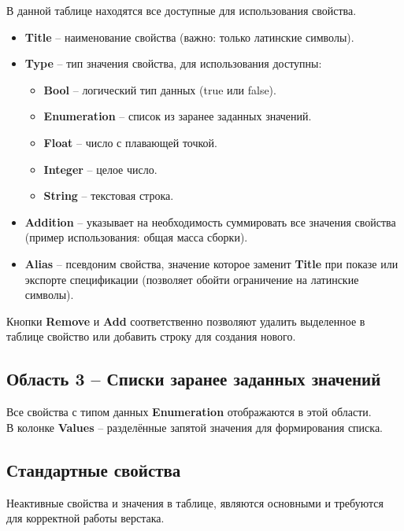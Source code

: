 \documentclass[a4paper,12pt]{article}
\begin{document}
В данной таблице находятся все доступные для использования свойства.
\begin{itemize}
	\item \textbf{Title} -- наименование свойства (важно: только латинские символы).
	\item \textbf{Type} -- тип значения свойства, для использования доступны:
	\begin{itemize}
		\item \textbf{Bool} -- логический тип данных (true или false).
		\item \textbf{Enumeration} -- список из заранее заданных значений.
		\item \textbf{Float} -- число с плавающей точкой.
		\item \textbf{Integer} -- целое число.
		\item \textbf{String} -- текстовая строка.
	\end{itemize}
	\item \textbf{Addition} -- указывает на необходимость суммировать все значения свойства\\(пример использования: общая масса сборки).
	\item \textbf{Alias} -- псевдоним свойства, значение которое заменит \textbf{Title} при показе или\\ экспорте спецификации (позволяет обойти ограничение на латинские символы).
\end{itemize}

\begin{flushleft}Кнопки \textbf{Remove} и \textbf{Add} соответственно позволяют удалить выделенное в таблице свойство или добавить строку для создания нового.\end{flushleft}

\subsection{Область 3 -- Списки заранее заданных значений}
Все свойства с типом данных \textbf{Enumeration} отображаются в этой области.\\В колонке \textbf{Values} -- разделённые запятой значения для формирования списка.




\subsection{Стандартные свойства}

Неактивные свойства и значения в таблице, являются основными и требуются для корректной работы верстака.
\end{document}
